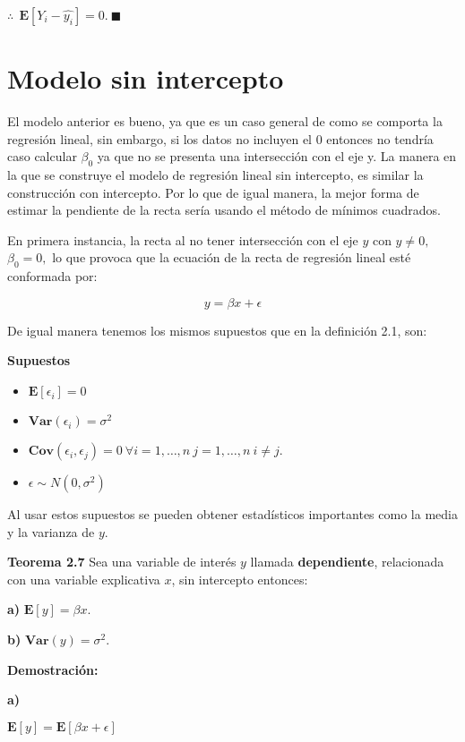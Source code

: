 \documentclass[
  a4paper,
  oneside,
  openany]{book}
\begin{document}
\(\therefore \ \ \mathbf{E}\left[ Y_{i}-\hat{y_{i}}\right]=0.\  \blacksquare\)

\hypertarget{modelo-sin-intercepto}{%
\chapter{Modelo sin intercepto}\label{modelo-sin-intercepto}}

El modelo anterior es bueno, ya que es un caso general de como se comporta la regresión lineal, sin embargo, si los datos no incluyen el 0 entonces no tendría caso calcular \(\beta_{0}\) ya que no se presenta una intersección con el eje y.
La manera en la que se construye el modelo de regresión lineal sin intercepto, es similar la construcción con intercepto. Por lo que de igual manera, la mejor forma de estimar la pendiente de la recta sería usando el método de mínimos cuadrados.

En primera instancia, la recta al no tener intersección con el eje \(y\) con \(y \neq 0,\) \(\beta_{0}=0,\) lo que provoca que la ecuación de la recta de regresión lineal esté conformada por:

\[y=\beta x + \epsilon\]

De igual manera tenemos los mismos supuestos que en la definición 2.1, son:

\textbf{Supuestos}

\begin{itemize}
\item
  \(\mathbf{E}[\epsilon_{i}]=0\)
\item
  \(\textbf{Var}(\epsilon_{i})=\sigma^2\)
\item
  \(\textbf{Cov}(\epsilon_{i},\epsilon_{j})= 0 \ \forall i = 1, \ldots, n \ j=1, \ldots, n \ i \neq j.\)
\item
  \(\epsilon \sim N(0,\sigma^2)\)
\end{itemize}

Al usar estos supuestos se pueden obtener estadísticos importantes como la
media y la varianza de \(y\).

\textbf{Teorema 2.7} Sea una variable de interés \(y\) llamada \textbf{dependiente}, relacionada con una variable explicativa \(x\), sin intercepto entonces:

\textbf{a)} \(\mathbf{E}[y]=\beta x.\)

\textbf{b)} \(\textbf{Var}(y)=\sigma^2.\)

\textbf{Demostración:}

\textbf{a)}

\(\mathbf{E}[y]=\mathbf{E}[\beta x + \epsilon]\)
\end{document}
